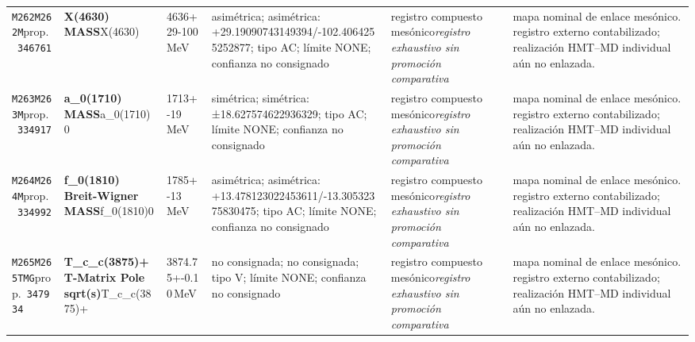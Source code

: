 \begin{landscape}
\begin{longtable}{L{1.85cm}L{4.45cm}L{2.35cm}L{4.05cm}L{3.35cm}L{7.15cm}}
\texttt{M262}\newline \texttt{M262M}\newline prop.\ \texttt{346761} & \textbf{X(4630) MASS}\newline X(4630) & 4636+29-100\,MeV & asimétrica; asimétrica: +29.19090743149394/-102.4064255252877; tipo AC; límite NONE; confianza no consignado & registro compuesto mesónico\newline \emph{registro exhaustivo sin promoción comparativa} & mapa nominal de enlace mesónico. registro externo contabilizado; realización HMT--MD individual aún no enlazada. \\
\texttt{M263}\newline \texttt{M263M}\newline prop.\ \texttt{334917} & \textbf{a\_\allowbreak{}0(1710) MASS}\newline a\_\allowbreak{}0(1710)0 & 1713+-19\,MeV & simétrica; simétrica: ±18.627574622936329; tipo AC; límite NONE; confianza no consignado & registro compuesto mesónico\newline \emph{registro exhaustivo sin promoción comparativa} & mapa nominal de enlace mesónico. registro externo contabilizado; realización HMT--MD individual aún no enlazada. \\
\texttt{M264}\newline \texttt{M264M}\newline prop.\ \texttt{334992} & \textbf{f\_\allowbreak{}0(1810) Breit-Wigner MASS}\newline f\_\allowbreak{}0(1810)0 & 1785+-13\,MeV & asimétrica; asimétrica: +13.478123022453611/-13.30532375830475; tipo AC; límite NONE; confianza no consignado & registro compuesto mesónico\newline \emph{registro exhaustivo sin promoción comparativa} & mapa nominal de enlace mesónico. registro externo contabilizado; realización HMT--MD individual aún no enlazada. \\
\texttt{M265}\newline \texttt{M265TMG}\newline prop.\ \texttt{347934} & \textbf{T\_\allowbreak{}c\_\allowbreak{}c(3875)+ T-Matrix Pole sqrt(s)}\newline T\_\allowbreak{}c\_\allowbreak{}c(3875)+ & 3874.75+-0.10\,MeV & no consignada; no consignada; tipo V; límite NONE; confianza no consignado & registro compuesto mesónico\newline \emph{registro exhaustivo sin promoción comparativa} & mapa nominal de enlace mesónico. registro externo contabilizado; realización HMT--MD individual aún no enlazada. \\

\end{longtable}
\end{landscape}
